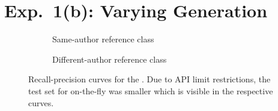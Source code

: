 \section{Exp.\ 1(b): Varying \Imp{} Generation}

\begin{figure}[H]
  \centering
  \begin{subfigure}{\textwidth}
    \centering
    
    \caption{Same-author reference class}
    \label{fig:student_essays_same_author}
  \end{subfigure}
  \begin{subfigure}{\textwidth}
    \centering
    
    \caption{Different-author reference class}
    \label{fig:student_essays_different_author}
  \end{subfigure}
  \caption[Recall-precision curves for the \dataStudent{}]{Recall-precision curves for the \dataStudent{}. 
Due to API limit restrictions, the test set for on-the-fly was smaller which is visible in the respective curves.
  }
  \label{fig:diff_imp_gen_student_essays}
\end{figure}
